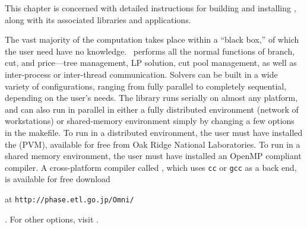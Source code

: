 
This chapter is concerned with detailed instructions for building and
installing \BB, along with its associated libraries and applications.

The vast majority of the computation takes place within a ``black box,'' of
which the user need have no knowledge. \BB\ performs all the normal functions
of branch, cut, and price---tree management, LP solution, cut pool management,
as well as inter-process or inter-thread communication. Solvers can be built
in a wide variety of configurations, ranging from fully parallel to completely
sequential, depending on the user's needs. The library runs serially on almost
any platform, and can also run in parallel in either a fully distributed
environment (network of workstations) or shared-memory environment simply by
changing a few options in the makefile. To run in a distributed environment,
the user must have installed the {\em
{}}
(PVM), available for free from Oak Ridge National Laboratories.
To run in a shared memory environment, the user must have installed an
OpenMP compliant compiler. A cross-platform compiler called {\em
{}}, which uses 
{\tt cc} or {\tt gcc} as a back end, is available for free download
\begin{latexonly}
at {\tt http://phase.etl.go.jp/Omni/}
\end{latexonly}. For other options, visit
\texttt{}.

